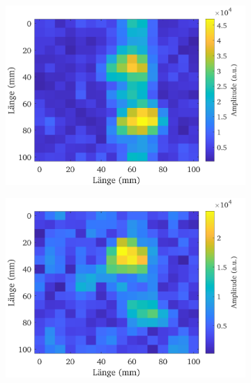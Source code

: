 \documentclass[../../main.tex]{subfiles}
\begin{document}
        \begin{figure}[h!]
            \begin{subfigure}[c]{0.5\textwidth}
                \includegraphics[width=\linewidth]{Bilddateien/13/YZ-4000-100/Fig_1}
                \label{fig:MRI_2D_YZ_4000_100}
            \end{subfigure}
            \begin{subfigure}[c]{0.5\textwidth}
                \includegraphics[width=\linewidth]{Bilddateien/13/YZ-500-100/Fig_1}

\end{subfigure}
\end{figure}
\end{document}
